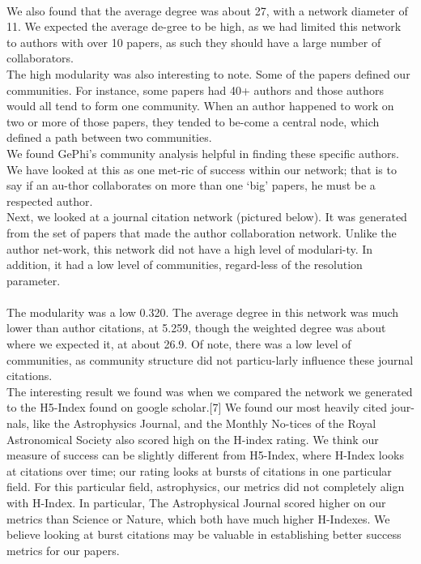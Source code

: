 \documentclass[times, 10pt,twocolumn]{article}
\begin{document}
 \\
We also found that the average degree was about 27, with a network diameter of 11. We expected the average de-gree to be high, as we had limited this network to authors with over 10 papers, as such they should have a large number of collaborators. \\
The high modularity was also interesting to note. Some of the papers defined our communities. For instance, some papers had 40+ authors and those authors would all tend to form one community. When an author happened to work on two or more of those papers, they tended to be-come a central node, which defined a path between two communities. \\
We found GePhi’s community analysis helpful in finding these specific authors. We have looked at this as one met-ric of success within our network; that is to say if an au-thor collaborates on more than one ‘big’ papers, he must be a respected author. \\
Next, we looked at a journal citation network (pictured below). It was generated from the set of papers that made the author collaboration network. Unlike the author net-work, this network did not have a high level of modulari-ty. In addition, it had a low level of communities, regard-less of the resolution parameter.\\
 \\
The modularity was a low 0.320. The average degree in this network was much lower than author citations, at 5.259, though the weighted degree was about where we expected it, at about 26.9. Of note, there was a low level of communities, as community structure did not particu-larly influence these journal citations.\\
The interesting result we found was when we compared the network we generated to the H5-Index found on google scholar.[7] We found our most heavily cited jour-nals, like the Astrophysics Journal, and the Monthly No-tices of the Royal Astronomical Society also scored high on the H-index rating. We think our measure of success can be slightly different from H5-Index, where H-Index looks at citations over time; our rating looks at bursts of citations in one particular field. For this particular field, astrophysics, our metrics did not completely align with H-Index. In particular, The Astrophysical Journal scored higher on our metrics than Science or Nature, which both have much higher H-Indexes. We believe looking at burst citations may be valuable in establishing better success metrics for our papers.\\
\end{document}
